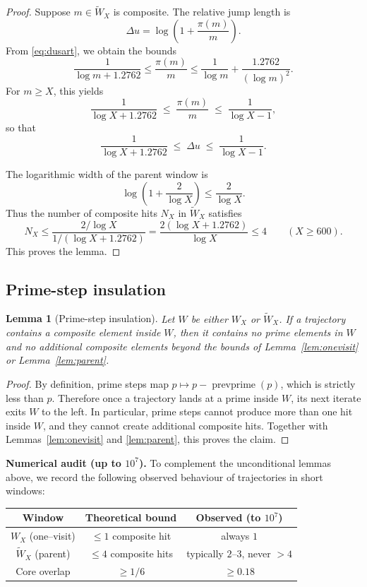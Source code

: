 \documentclass[11pt]{article}
\theoremstyle{plain}
\newtheorem{lemma}[theorem]{Lemma}
\theoremstyle{definition}
\theoremstyle{remark}
\begin{document}
\begin{proof}
Suppose $m\in \widetilde W_X$ is composite. The relative jump length is
\[
\Delta u = \log\!\left(1+\frac{\pi(m)}{m}\right).
\]
From \eqref{eq:dusart}, we obtain the bounds
\[
\frac{1}{\log m+1.2762} \leq \frac{\pi(m)}{m} \leq \frac{1}{\log m}+\frac{1.2762}{(\log m)^2}.
\]
For $m\geq X$, this yields
\[
\frac{1}{\log X+1.2762} \;\leq\; \frac{\pi(m)}{m} \;\leq\; \frac{1}{\log X-1},
\]
so that
\begin{equation}\label{eq:deltabounds}
\frac{1}{\log X+1.2762} \;\leq\; \Delta u \;\leq\; \frac{1}{\log X-1}.
\end{equation}

The logarithmic width of the parent window is
\[
\log\!\left(1+\frac{2}{\log X}\right) \leq \frac{2}{\log X}.
\]
Thus the number of composite hits $N_X$ in $\widetilde W_X$ satisfies
\[
N_X \leq \frac{2/\log X}{1/(\log X+1.2762)} = \frac{2(\log X+1.2762)}{\log X} \le 4\qquad (X\ge 600).
\]
This proves the lemma.
\end{proof}

\subsection{Prime-step insulation}

\begin{lemma}[Prime-step insulation]\label{lem:prime-insulation}
Let $W$ be either $W_X$ or $\widetilde W_X$. If a trajectory contains a composite element inside $W$, then it contains no prime elements in $W$ and no additional composite elements beyond the bounds of Lemma~\ref{lem:onevisit} or Lemma~\ref{lem:parent}.
\end{lemma}

\begin{proof}
By definition, prime steps map $p \mapsto p - \operatorname{prevprime}(p)$, which is strictly less than $p$. Therefore once a trajectory lands at a prime inside $W$, its next iterate exits $W$ to the left. In particular, prime steps cannot produce more than one hit inside $W$, and they cannot create additional composite hits. Together with Lemmas~\ref{lem:onevisit} and \ref{lem:parent}, this proves the claim.
\end{proof}

\medskip
\noindent\textbf{Numerical audit (up to $10^7$).}
To complement the unconditional lemmas above, we record the following observed
behaviour of trajectories in short windows:

\begin{center}
\renewcommand{\arraystretch}{1.2}
\begin{tabular}{|c|c|c|}
\hline
Window & Theoretical bound & Observed (to $10^7$) \\
\hline
$W_X$ (one--visit) & $\leq 1$ composite hit & always $1$ \\
$\widetilde W_X$ (parent) & $\leq 4$ composite hits & typically $2$--$3$, never $>4$ \\
Core overlap & $\geq 1/6$ & $\geq 0.18$ \\
\hline
\end{tabular}
\end{center}
\end{document}
